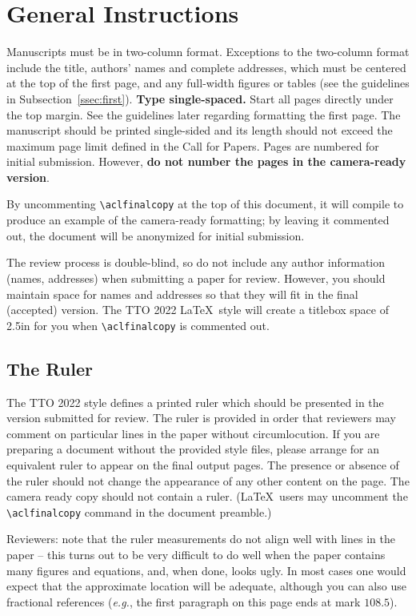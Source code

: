 \documentclass[11pt,a4paper]{article}
\begin{document}
\section{General Instructions}

Manuscripts must be in two-column format.  Exceptions to the
two-column format include the title, authors' names and complete
addresses, which must be centered at the top of the first page, and
any full-width figures or tables (see the guidelines in
Subsection~\ref{ssec:first}). \textbf{Type single-spaced.}  Start all
pages directly under the top margin. See the guidelines later
regarding formatting the first page.  The manuscript should be
printed single-sided and its length
should not exceed the maximum page limit defined in the Call for Papers.
Pages are numbered for  initial submission. However, \textbf{do not number the pages in the camera-ready version}.

By uncommenting {\small\verb|\aclfinalcopy|} at the top of this 
 document, it will compile to produce an example of the camera-ready formatting; by leaving it commented out, the document will be anonymized for initial submission.  

The review process is double-blind, so do not include any author information (names, addresses) when submitting a paper for review.  
However, you should maintain space for names and addresses so that they will fit in the final (accepted) version.  The TTO 2022 \LaTeX\ style will create a titlebox space of 2.5in for you when {\small\verb|\aclfinalcopy|} is commented out.  

\subsection{The Ruler}
The TTO 2022 style defines a printed ruler which should be presented in the
version submitted for review.  The ruler is provided in order that
reviewers may comment on particular lines in the paper without
circumlocution.  If you are preparing a document without the provided
style files, please arrange for an equivalent ruler to
appear on the final output pages.  The presence or absence of the ruler
should not change the appearance of any other content on the page.  The
camera ready copy should not contain a ruler. (\LaTeX\ users may uncomment the {\small\verb|\aclfinalcopy|} command in the document preamble.)  

Reviewers: note that the ruler measurements do not align well with
lines in the paper -- this turns out to be very difficult to do well
when the paper contains many figures and equations, and, when done,
looks ugly. In most cases one would expect that the approximate
location will be adequate, although you can also use fractional
references (\emph{e.g.}, the first paragraph on this page ends at mark $108.5$).
\end{document}
